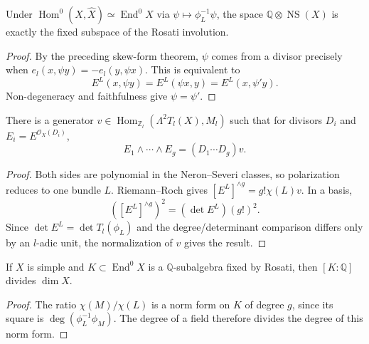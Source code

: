 \begin{theorem}
\label{mumford-thm-ns-rosati-fixed}
Under $\operatorname{Hom}^0(X,\widehat X)\simeq\operatorname{End}^0X$ via
$\psi\mapsto\phi_L^{-1}\psi$, the space
$\mathbb Q\otimes\operatorname{NS}(X)$ is exactly the fixed subspace of
the Rosati involution.
\end{theorem}
\begin{proof}
By the preceding skew-form theorem, $\psi$ comes from a divisor precisely
when $e_l(x,\psi y)=-e_l(y,\psi x)$. This is equivalent to
\[
E^L(x,\psi y)=E^L(\psi x,y)=E^L(x,\psi'y).
\]
Non-degeneracy and faithfulness give $\psi=\psi'$.
\end{proof}

\begin{theorem}
\label{mumford-thm-riemann-wedge-intersection}
There is a generator
$v\in\operatorname{Hom}_{\mathbb Z_l}(\Lambda^2T_l(X),M_l)$ such that
for divisors $D_i$ and $E_i=E^{\mathcal O_X(D_i)}$,
\[
E_1\wedge\cdots\wedge E_g=(D_1\cdots D_g)v.
\]
\end{theorem}
\begin{proof}
Both sides are polynomial in the Neron--Severi classes, so polarization
reduces to one bundle $L$. Riemann--Roch gives
$[E^L]^{\wedge g}=g!\chi(L)v$. In a basis,
\[
([E^L]^{\wedge g})^2=(\det E^L)(g!)^2.
\]
Since $\det E^L=\det T_l(\phi_L)$ and the degree/determinant comparison
differs only by an $l$-adic unit, the normalization of $v$ gives the result.
\end{proof}

\begin{corollary}
\label{mumford-cor-rosati-subalgebra-degree}
If $X$ is simple and $K\subset\operatorname{End}^0X$ is a $\mathbb Q$-subalgebra
fixed by Rosati, then $[K:\mathbb Q]$ divides $\dim X$.
\end{corollary}
\begin{proof}
The ratio $\chi(M)/\chi(L)$ is a norm form on $K$ of degree $g$, since its
square is $\deg(\phi_L^{-1}\phi_M)$. The degree of a field therefore divides
the degree of this norm form.
\end{proof}


